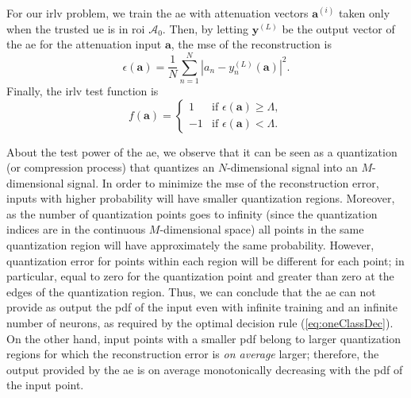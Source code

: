 \documentclass[draftcls,onecolumn,12pt]{IEEEtran}
\begin{document}
{For our \ac{irlv} problem, we train the \ac{ae} with attenuation vectors $\bm{a}^{(i)}$ taken only when the trusted \ac{ue} is in  \ac{roi} $\mathcal A_0$. Then, by letting $\bm{y}^{(L)}$ be the output vector of the \ac{ae} for the attenuation input $\bm{a}$, the \ac{mse} of the reconstruction is 
\begin{equation}\label{eq: rec err}
    \epsilon(\bm{a} ) = \frac{1}{N}\sum_{n=1}^{N}|a_n-y^{(L)}_n(\bm{a})|^2.
\end{equation}
Finally, the \ac{irlv} test function  is  
\begin{equation}
f(\bm{a}) =
\begin{cases}
1 &\text{if } \epsilon(\bm{a} ) \geq \Lambda, \\
-1 & \text{if } \epsilon(\bm{a} ) < \Lambda.
\end{cases}
\end{equation}

About the test power of the \ac{ae}, we observe that it can be seen as a quantization (or compression process) that quantizes an $N$-dimensional signal into an $M$-dimensional signal. In order to minimize the \ac{mse} of the reconstruction error, inputs with higher probability will have smaller quantization regions. Moreover, as the number of quantization points goes to infinity (since the quantization indices are in the continuous $M$-dimensional space) all points in the same quantization region will have approximately the same probability. However, quantization error for points within each region will be different for each point; in particular, equal to zero for the quantization point and greater than zero at the edges of the quantization region. Thus, we can conclude that the \ac{ae} can not provide as output the \ac{pdf} of the input even with infinite training and an infinite number of neurons, as required by the optimal decision rule (\ref{eq:oneClassDec}). On the other hand, input points with a smaller \ac{pdf} belong to larger quantization regions for which the reconstruction error is {\em on average} larger; therefore, the output provided by the \ac{ae} is on average monotonically decreasing with the \ac{pdf} of the input point. 

}
\end{document}

